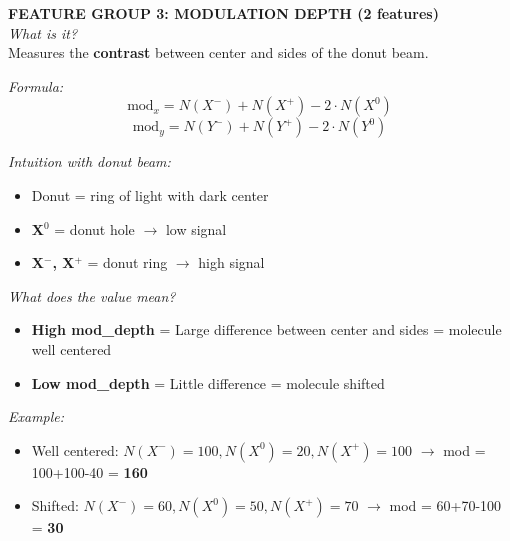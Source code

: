 \documentclass[a4paper,10pt]{article}
\begin{document}
\vspace{0.3cm}

\begin{mdframed}[style=konzept]
\textbf{FEATURE GROUP 3: MODULATION DEPTH (2 features)}\\[5pt]
\textit{What is it?}\\
Measures the \textbf{contrast} between center and sides of the donut beam.

\textit{Formula:}
$$\text{mod}_x = N(X^-) + N(X^+) - 2 \cdot N(X^0)$$
$$\text{mod}_y = N(Y^-) + N(Y^+) - 2 \cdot N(Y^0)$$

\textit{Intuition with donut beam:}
\begin{itemize}[leftmargin=*, nosep]
    \item Donut = ring of light with dark center
    \item \textbf{X$^0$} = donut hole $\rightarrow$ low signal
    \item \textbf{X$^-$, X$^+$} = donut ring $\rightarrow$ high signal
\end{itemize}

\textit{What does the value mean?}
\begin{itemize}[leftmargin=*, nosep]
    \item \textbf{High mod\_depth} = Large difference between center and sides = molecule well centered
    \item \textbf{Low mod\_depth} = Little difference = molecule shifted
\end{itemize}

\textit{Example:}
\begin{itemize}[leftmargin=*, nosep]
    \item Well centered: $N(X^-)=100, N(X^0)=20, N(X^+)=100$ $\rightarrow$ mod = 100+100-40 = \textbf{160}
    \item Shifted: $N(X^-)=60, N(X^0)=50, N(X^+)=70$ $\rightarrow$ mod = 60+70-100 = \textbf{30}
\end{itemize}
\end{mdframed}

\vspace{0.3cm}
\end{document}

